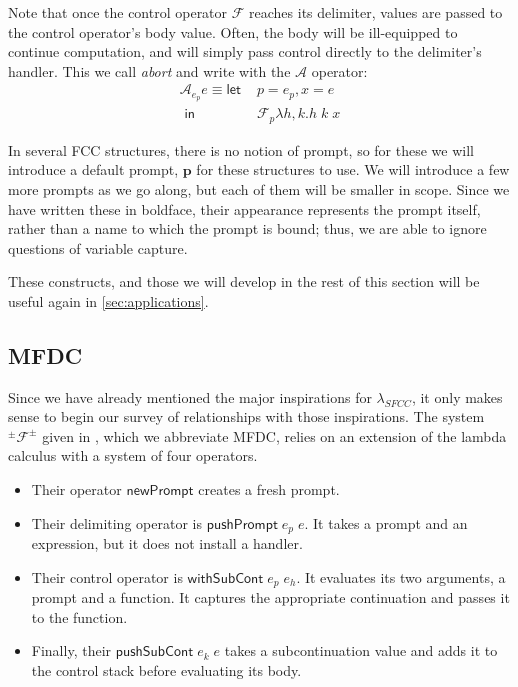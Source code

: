 \documentclass[11pt]{article}
\newcommand{\maybePage}{\newpage}
\newcommand{\letin}[2]{\textsf{let }#1\textsf{ in }#2}
\newcommand\F{\mathcal{F}}
\newcommand\A{\mathcal{A}}
\newcommand\pmFpm{^\pm\F^\pm}
\begin{document}
Note that once the control operator $\F$ reaches its delimiter, values are passed to the control operator's body value.
Often, the body will be ill-equipped to continue computation, and will simply pass control directly to the delimiter's handler.
This we call \emph{abort} and write with the $\A$ operator:
\begin{align*}
\A_{e_p}e \equiv \letin{&p = e_p, x = e\\}%
                       {&\F_{p}\lambda h,k. h\;k\;x}
\end{align*}

In several FCC structures, there is no notion of prompt, so for these we will introduce a default prompt, $\mathbf{p}$ for these structures to use.
We will introduce a few more prompts as we go along, but each of them will be smaller in scope.
Since we have written these in boldface, their appearance represents the prompt itself, rather than a name to which the prompt is bound; thus, we are able to ignore questions of variable capture.

These constructs, and those we will develop in the rest of this section will be useful again in \ref{sec:applications}.

\maybePage
\subsection{MFDC}

Since we have already mentioned the major inspirations for $\lambda_{SFCC}$, it only makes sense to begin our survey of relationships with those inspirations.
The system $\pmFpm$ given in \cite{MFDC}, which we abbreviate MFDC, relies on an extension of the lambda calculus with a system of four operators.

\begin{itemize}
\item Their operator $\mathsf{newPrompt}$ creates a fresh prompt.
\item Their delimiting operator is $\mathsf{pushPrompt}\;e_p\;e$.
It takes a prompt and an expression, but it does not install a handler.
\item Their control operator is $\mathsf{withSubCont}\;e_p\;e_h$.
It evaluates its two arguments, a prompt and a function.
It captures the appropriate continuation and passes it to the function.
\item Finally, their $\mathsf{pushSubCont}\;e_k\;e$ takes a subcontinuation value and adds it to the control stack before evaluating its body.
\end{itemize}
\end{document}
